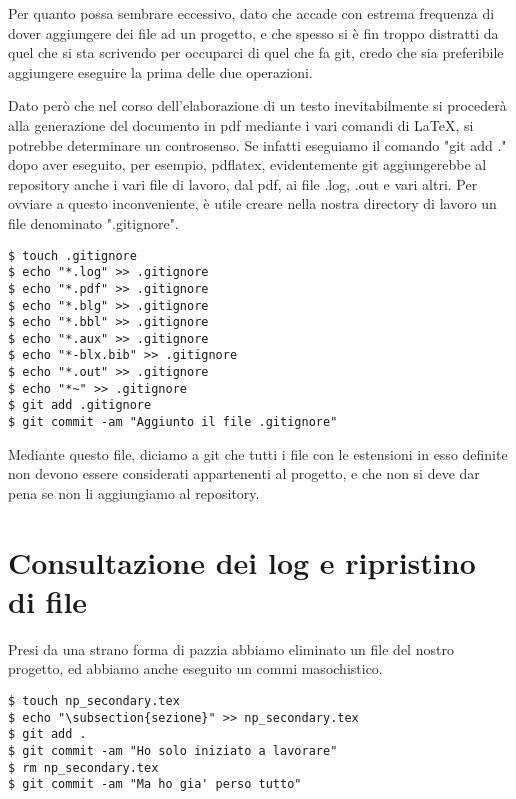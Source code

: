 \documentclass{article}
\begin{document}
Per quanto possa sembrare eccessivo, dato che accade con estrema frequenza di
dover aggiungere dei file ad un progetto, e che spesso si è fin troppo
distratti da quel che si sta scrivendo per occuparci di quel che fa git, credo
che sia preferibile aggiungere eseguire la prima delle due operazioni.

Dato però che nel corso dell'elaborazione di un testo inevitabilmente si
procederà alla generazione del documento in pdf mediante i vari comandi di
\LaTeX, si potrebbe determinare un controsenso. Se infatti eseguiamo il comando
"git add ." dopo aver eseguito,
per esempio, pdflatex, evidentemente git aggiungerebbe al repository anche i
vari file di lavoro, dal pdf, ai file .log, .out e vari altri.
Per ovviare a questo inconveniente, è utile creare nella nostra directory di
lavoro un file denominato ".gitignore".

\begin{framed}
\begin{lstlisting}
$ touch .gitignore
$ echo "*.log" >> .gitignore
$ echo "*.pdf" >> .gitignore
$ echo "*.blg" >> .gitignore
$ echo "*.bbl" >> .gitignore
$ echo "*.aux" >> .gitignore
$ echo "*-blx.bib" >> .gitignore
$ echo "*.out" >> .gitignore
$ echo "*~" >> .gitignore
$ git add .gitignore
$ git commit -am "Aggiunto il file .gitignore"
\end{lstlisting}
\end{framed}

Mediante questo file, diciamo a git che tutti i file con le estensioni in esso
definite non devono essere considerati appartenenti al progetto, e che non si
deve dar pena se non li aggiungiamo al repository.

\section{Consultazione dei log e ripristino di file}
Presi da una strano forma di pazzia abbiamo eliminato un file del nostro
progetto, ed abbiamo anche eseguito un commi masochistico.

\begin{framed}
\begin{lstlisting}
$ touch np_secondary.tex
$ echo "\subsection{sezione}" >> np_secondary.tex
$ git add .
$ git commit -am "Ho solo iniziato a lavorare"
$ rm np_secondary.tex
$ git commit -am "Ma ho gia' perso tutto"
\end{lstlisting}
\end{framed}
\end{document}
